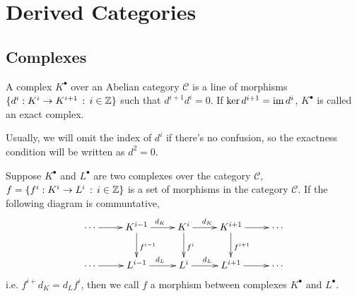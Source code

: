 \chapter{Derived Categories}

\section{Complexes}

\begin{definition}
    A complex $K^\bullet$ over an Abelian category $\mathcal C$ 
    is a line of morphisms $\{d^i:K^i\to K^{i+1}\,:\, i\in \mathbb{Z}\}$ 
    such that $d^{i+1}d^i=0$. If $\ker d^{i+1}=\operatorname{im} d^i$, $K^\bullet$
    is called an exact complex.
\end{definition}

Usually, we will omit the index of $d^i$ if there's no confusion, so
the exactness condition will be written as $d^2=0$.

\begin{definition}
    Suppose $K^\bullet$ and $L^\bullet$ are two complexes over the
    category $\mathcal C$, $f=\{f^i:K^i\to L^i\,:\,i\in \mathbb{Z}\}$ is a 
    set of morphisms in the category $\mathcal C$. If the following
    diagram is communtative,
    \[
        \xymatrix{
        \cdots \ar[r]&K^{i-1}\ar[r]^{d_K}\ar[d]^{f^{i-1}}
        &K^{i}\ar[r]^{d_K}\ar[d]^{f^{i}}&K^{i+1}\ar[r]
        \ar[d]^{f^{i+1}}&\cdots\\
        \cdots \ar[r]&L^{i-1}\ar[r]^{d_L}&L^{i}\ar[r]^{d_L}&
        L^{i+1}\ar[r]&\cdots
        }
    \]
    i.e. $f^{i+}d_K=d_Lf^i$, then we call $f$ a morphism between
    complexes $K^\bullet$ and $L^\bullet$.
\end{definition}